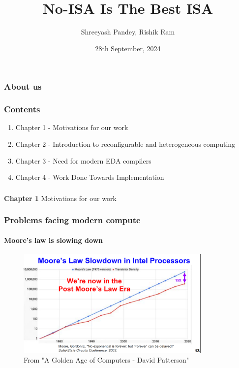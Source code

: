 \documentclass{beamer}
\title{No-ISA Is The Best ISA}
\subtitle{}
\author{Shreeyash Pandey, Rishik Ram}
\institute{Vicharak, India @ vicharak.in}
\date{28th September, 2024}
\begin{document}
\begin{frame}
\titlepage
\end{frame}

\begin{frame}[fragile]
\frametitle{About us}

\framesubtitle{}
\end{frame}

\begin{frame}[fragile]
\frametitle{Contents}

  \begin{enumerate}
    \item Chapter 1 - Motivations for our work
    \item Chapter 2 - Introduction to reconfigurable and heterogeneous computing
    \item Chapter 3 - Need for modern EDA compilers
    \item Chapter 4 - Work Done Towards Implementation  
  \end{enumerate}
\end{frame}

\begin{frame}[c,fragile]
  \frametitle{}
  \centering
  \textbf{Chapter 1}
  \centering
  Motivations for our work
\end{frame}

\begin{frame}[fragile]
\frametitle{Problems facing modern compute}
\framesubtitle{Moore's law is slowing down}

  \begin{figure}
    \centering
    \includegraphics[width=0.85\textwidth]{mooreslaw.png}
    \caption{From "A Golden Age of Computers - David Patterson"}
  \end{figure}

\end{frame}
\end{document}
